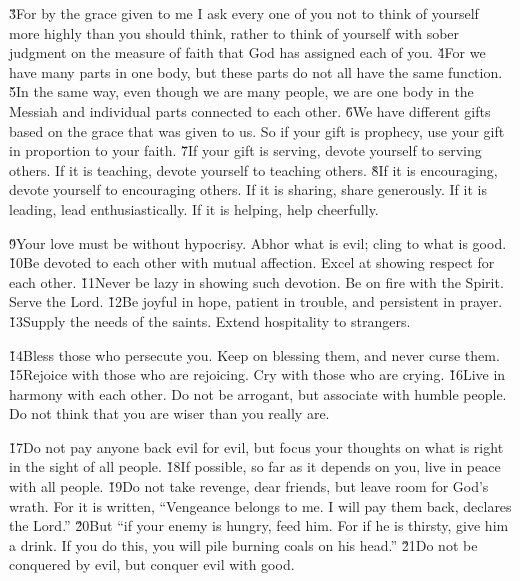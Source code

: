 \v{3}For by the grace given to me I ask every one of you not to think of yourself more highly than you should think, rather to think of yourself with sober judgment on the measure of faith that God has assigned each of you. \v{4}For we have many parts in one body, but these parts do not all have the same function. \v{5}In the same way, even though we are many people, we are one body in the Messiah and individual parts connected to each other. \v{6}We have different gifts based on the grace that was given to us. So if your gift is prophecy, use your gift in proportion to your faith. \v{7}If your gift is serving, devote yourself to serving others. If it is teaching, devote yourself to teaching others. \v{8}If it is encouraging, devote yourself to encouraging others. If it is sharing, share generously. If it is leading, lead enthusiastically. If it is helping, help cheerfully.

\v{9}Your love must be without hypocrisy. Abhor what is evil; cling to what is good. \v{10}Be devoted to each other with mutual affection. Excel at showing respect for each other. \v{11}Never be lazy in showing such devotion. Be on fire with the Spirit. Serve the Lord. \v{12}Be joyful in hope, patient in trouble, and persistent in prayer. \v{13}Supply the needs of the saints. Extend hospitality to strangers.

\v{14}Bless those who persecute you. Keep on blessing them, and never curse them. \v{15}Rejoice with those who are rejoicing. Cry with those who are crying. \v{16}Live in harmony with each other. Do not be arrogant, but associate with humble people. Do not think that you are wiser than you really are.

\v{17}Do not pay anyone back evil for evil, but focus your thoughts on what is right in the sight of all people. \v{18}If possible, so far as it depends on you, live in peace with all people. \v{19}Do not take revenge, dear friends, but leave room for God's wrath. For it is written, ``Vengeance belongs to me. I will pay them back, declares the Lord.'' \v{20}But ``if your enemy is hungry, feed him. For if he is thirsty, give him a drink. If you do this, you will pile burning coals on his head.'' \v{21}Do not be conquered by evil, but conquer evil with good.

